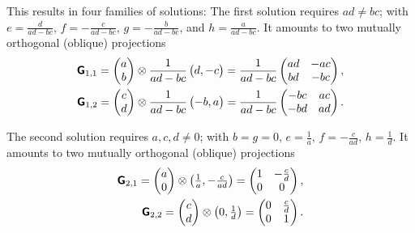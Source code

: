 {This results in four families of solutions:
The first solution  requires $ad\neq bc$; with
$e=\frac{d}{ad - bc}$,
$f=-\frac{c}{ad - bc}$,
$g=-\frac{b}{ad - bc}$, and
$h=\frac{a}{ad - bc}$.
It amounts to two  mutually orthogonal (oblique) projections
\begin{equation}
\begin{split}
\textsf{\textbf{G}}_{1,1}=\begin{pmatrix}
a \\
b
\end{pmatrix}
\otimes
\frac{1}{a d - b c}
\begin{pmatrix}
d,-c
\end{pmatrix}
=
\frac{1}{a d - b c}
\begin{pmatrix}
a d & - a c \\
b d & - b c
\end{pmatrix}
      ,
\\
\textsf{\textbf{G}}_{1,2}=
\begin{pmatrix}
c \\
d
\end{pmatrix}
\otimes
\frac{1}{a d - b c}
\begin{pmatrix}
-b,a
\end{pmatrix}
=
\frac{1}{a d - b c}
\begin{pmatrix}
-b c &  a c \\
-b d & a d
\end{pmatrix}
     .
\end{split}
\end{equation}

The second solution  requires $a,c,d\neq 0$; with
$b=g=0$,
$e=\frac{1}{a}$,
$f=-\frac{c}{ad}$,
$h=\frac{1}{d}$.
It amounts to two  mutually orthogonal (oblique) projections
\begin{equation}
\begin{split}
\textsf{\textbf{G}}_{2,1}=\begin{pmatrix}
a \\
0
\end{pmatrix}
\otimes
\begin{pmatrix}
\frac{1}{a},-\frac{c}{ad}
\end{pmatrix}
=
\begin{pmatrix}
1 & - \frac{c}{d} \\
0 & 0
\end{pmatrix}
      ,
\\
\textsf{\textbf{G}}_{2,2}=
\begin{pmatrix}
c \\
d
\end{pmatrix}
\otimes
\begin{pmatrix}
0,\frac{1}{d}
\end{pmatrix}
=
\begin{pmatrix}
0&  \frac{c}{d} \\
0 & 1
\end{pmatrix}
      .
\end{split}
\end{equation}

}
